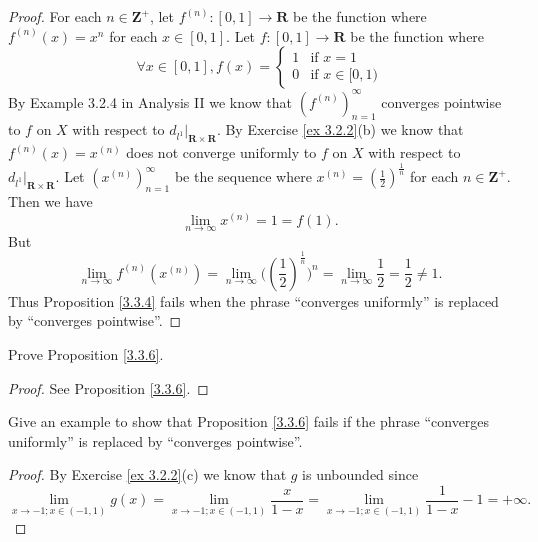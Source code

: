 \begin{proof}
    For each \(n \in \mathbf{Z}^+\), let \(f^{(n)} : [0, 1] \to \mathbf{R}\) be the function where \(f^{(n)}(x) = x^n\) for each \(x \in [0, 1]\).
    Let \(f : [0, 1] \to \mathbf{R}\) be the function where
    \[
        \forall x \in [0, 1], f(x) = \begin{cases}
            1 & \text{if } x = 1        \\
            0 & \text{if } x \in [0, 1)
        \end{cases}
    \]
    By Example 3.2.4 in Analysis II we know that \((f^{(n)})_{n = 1}^\infty\) converges pointwise to \(f\) on \(X\) with respect to \(d_{l^1}|_{\mathbf{R} \times \mathbf{R}}\).
    By Exercise \ref{ex 3.2.2}(b) we know that \(f^{(n)}(x) = x^{(n)}\) does not converge uniformly to \(f\) on \(X\) with respect to \(d_{l^1}|_{\mathbf{R} \times \mathbf{R}}\).
    Let \((x^{(n)})_{n = 1}^\infty\) be the sequence where \(x^{(n)} = (\frac{1}{2})^{\frac{1}{n}}\) for each \(n \in \mathbf{Z}^+\).
    Then we have
    \[
        \lim_{n \to \infty} x^{(n)} = 1 = f(1).
    \]
    But
    \[
        \lim_{n \to \infty} f^{(n)}(x^{(n)}) = \lim_{n \to \infty} \big((\frac{1}{2})^{\frac{1}{n}}\big)^n = \lim_{n \to \infty} \frac{1}{2} = \frac{1}{2} \neq 1.
    \]
    Thus Proposition \ref{3.3.4} fails when the phrase ``converges uniformly'' is replaced by ``converges pointwise''.
\end{proof}

\begin{exercise}\label{ex 3.3.6}
    Prove Proposition \ref{3.3.6}.
\end{exercise}

\begin{proof}
    See Proposition \ref{3.3.6}.
\end{proof}

\begin{exercise}\label{ex 3.3.7}
    Give an example to show that Proposition \ref{3.3.6} fails if the phrase ``converges uniformly'' is replaced by ``converges pointwise''.
\end{exercise}

\begin{proof}
    By Exercise \ref{ex 3.2.2}(c) we know that \(g\) is unbounded since
    \[
        \lim_{x \to -1 ; x \in (-1, 1)} g(x) = \lim_{x \to -1 ; x \in (-1, 1)} \frac{x}{1 - x} = \lim_{x \to -1 ; x \in (-1, 1)} \frac{1}{1 - x} - 1 = +\infty.
    \]
\end{proof}


